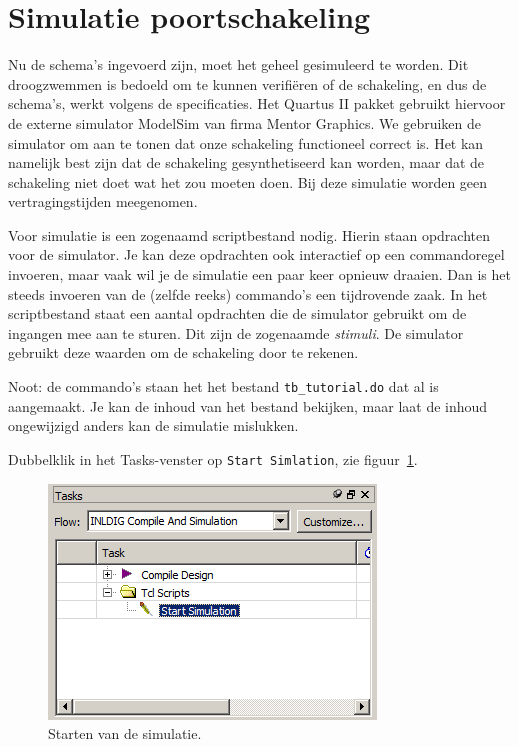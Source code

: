 \documentclass[a4paper,12pt,fleqn,twoside]{book}
\def\tutpicscale{0.455}
\newcommand{\naam}[1]{\texttt{#1}}
\begin{document}
\section{Simulatie poortschakeling}
\label{sec:simulatiepoortschakeling}
Nu de schema's ingevoerd zijn, moet het geheel gesimuleerd te worden. Dit
droogzwemmen is bedoeld om te kunnen verifi\"{e}ren of de schakeling, en dus
de schema's, werkt volgens de specificaties. Het Quartus II pakket gebruikt
hiervoor de externe simulator ModelSim van firma Mentor Graphics. We gebruiken
de simulator om aan te tonen dat onze schakeling functioneel correct is. Het
kan namelijk best zijn dat de schakeling gesynthetiseerd kan worden, maar dat
de schakeling niet doet wat het zou moeten doen. Bij deze simulatie worden
geen vertragingstijden meegenomen.
 
Voor simulatie is een zogenaamd scriptbestand nodig. Hierin staan opdrachten
voor de simulator. Je kan deze opdrachten ook interactief op een commandoregel
invoeren, maar vaak wil je de simulatie een paar keer opnieuw draaien. Dan is
het steeds invoeren van de (zelfde reeks) commando's een tijdrovende zaak. 
In het scriptbestand staat een aantal opdrachten die de simulator gebruikt om
de ingangen mee aan te sturen. Dit zijn de zogenaamde \textsl{stimuli}. De
simulator gebruikt deze waarden om de schakeling door te rekenen. 
 
Noot: de commando's staan het het bestand \naam{tb\_tutorial.do} dat al is
aangemaakt. Je kan de inhoud van het bestand bekijken, maar laat de inhoud
ongewijzigd anders kan de simulatie mislukken. 
 
Dubbelklik in het Tasks-venster op \naam{Start Simlation}, zie
figuur~\ref{fig:043startsimulation}.

\begin{figure}[H]
\centering
\includegraphics[scale=\tutpicscale]{043startsimulation}
\caption{Starten van de simulatie.}
\label{fig:043startsimulation}
\end{figure}
\end{document}
